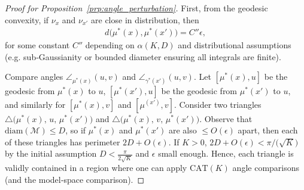 \begin{proof}[Proof for Proposition~\ref{prp:angle_perturbation}]
    First, from the geodesic convexity, if $\nu_x$ and $\nu_{x'}$ are close in distribution, then
    \begin{align*}
        d\bigl(\mu^*(x),\mu^*(x')\bigr) = C''\epsilon,
    \end{align*}
    for some constant $C''$ depending on \(\alpha(K,D)\) and distributional assumptions (e.g. sub‐Gaussianity or bounded diameter ensuring all integrals are finite).

    Compare angles $\angle_{\mu^*(x)}(u,v)$ and $\angle_{\gamma^*(x')}(u,v)$.
    Let $[\mu^*(x),u]$ be the geodesic from $\mu^*(x)$ to $u$, $[\mu^*(x'),u]$ be the geodesic from $\mu^*(x')$ to $u$, and similarly for $[\mu^*(x), v]$ and $[\mu^(x'), v]$.
    Consider two triangles $\triangle \bigl(\mu^*(x),\,u,\,\mu^*(x')\bigr)$ and $\triangle \bigl(\mu^*(x),\,v,\,\mu^*(x')\bigr)$.  
    Observe that $\mathrm{diam}(\mathcal{M})\le D$, so if $\mu^*(x)$ and $\mu^*(x')$ are also $\le O(\epsilon)$ apart, then each of these triangles has perimeter $2D + O(\epsilon)$.
    If $K>0$, $2D + O(\epsilon)< \pi/\bigl(\sqrt{K}\bigr)$ by the initial assumption $D< \frac{\pi}{2\sqrt{K}}$ and $\epsilon$ small enough.
    Hence, each triangle is validly contained in a region where one can apply $\mathrm{CAT}(K)$ angle comparisons (and the model‐space comparison).


\end{proof}
